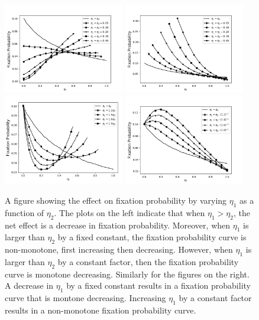 \documentclass[12pt]{article}
\begin{document}
\begin{figure}[H]
\begin{center}
\includegraphics[width=0.47\textwidth]{eta_plus_const.png}
\includegraphics[width=0.47\textwidth]{eta_minus_const.png}\\
\includegraphics[width=0.47\textwidth]{eta_times_const.png}
\includegraphics[width=0.47\textwidth]{eta_div_const.png}
\end{center}
\caption{A figure showing the effect on fixation probability by varying $\eta_1$ as a function of $\eta_2$. The plots on the left indicate that when $\eta_1>\eta_2$, the net effect is a decrease in fixation probability. Moreover, when $\eta_1$ is larger than $\eta_2$ by a fixed constant, the fixation probability curve is non-monotone, first increasing then decreasing. However, when $\eta_1$ is larger than $\eta_2$ by a constant factor, then the fixation probability curve is monotone decreasing. Similarly for the figures on the right. A decrease in $\eta_1$ by a fixed constant results in a fixation probability curve that is montone decreasing. Increasing $\eta_1$ by a constant factor results in a non-monotone fixation probability curve.}\label{eta_stack}
\end{figure}
\end{document}
